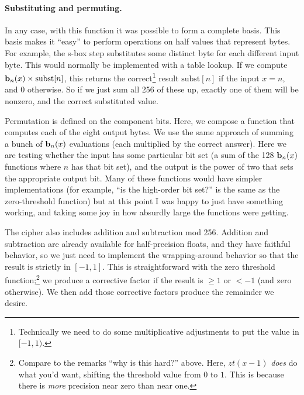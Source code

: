 \documentclass[twocolumn]{article}
\newcommand\basis{\ensuremath{\textrm{\bf b}}}
\begin{document}
\paragraph{Substituting and permuting.}
In any case, with this function it was possible to form a complete basis. This basis
makes it ``easy'' to perform operations on half values that represent bytes. For
example, the s-box step substitutes some distinct byte for each different input
byte. This would normally be implemented with a table lookup. If we compute
$\basis_n(x) \times \mathrm{subst}[n]$, this returns the correct\footnote{Technically
  we need to do some multiplicative adjustments to put the value in $[-1, 1)$.}
result $\mathrm{subst}[n]$ if the input $x = n$, and $0$ otherwise.
So if we just sum all 256 of these up, exactly one of them will be nonzero,
and the correct substituted value.

Permutation is defined on the component bits. Here, we compose a function that
computes each of the eight output bytes. We use the same approach of summing
a bunch of $\basis_n(x)$ evaluations (each multiplied by the correct answer).
Here we are testing whether the input has some particular bit set (a sum of the
128 $\basis_n(x)$ functions where $n$ has that bit set), and the output is the
power of two that sets the appropriate output bit. Many of these functions would
have simpler implementations (for example, ``is the high-order bit set?'' is the
same as the zero-threshold function) but at this point I was happy to just have
something working, and taking some joy in how absurdly large the functions
were getting.

\label{sec:cryptmodularaddition}
The cipher also includes addition and subtraction mod 256. Addition
and subtraction are already available for half-precision floats, and
they have faithful behavior, so we just need to implement the wrapping-around
behavior so that the result is strictly in $[-1, 1]$.
This is straightforward with the zero threshold function;\footnote{Compare to
  the remarks ``why is this hard?'' above. Here, $zt(x - 1)$ {\em does} do what you'd want,
  shifting the threshold value from $0$ to $1$. This is because there is {\em more}
  precision near zero than near one.}
we produce a corrective factor if the result is $\geq 1$ or $< -1$ (and zero otherwise).
We then add those corrective factors produce the remainder we desire.
\end{document}
